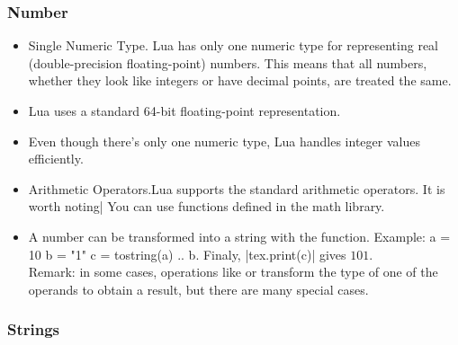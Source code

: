 \subsubsection{Number}


\begin{itemize}
  \item Single Numeric Type.  Lua has only one numeric type for representing real (double-precision floating-point) numbers. This means that all numbers, whether they look like integers or have decimal points, are treated the same.

\item Lua uses a standard 64-bit floating-point representation.
\item Even though there's only one numeric type, Lua handles integer values efficiently.

\item  Arithmetic Operators.Lua supports the standard arithmetic operators. It is worth noting|%
You can use functions defined in the math library.

\item A number can be transformed into a string with the  function. Example: a = 10 b = "1" c = tostring(a) .. b. Finaly, |tex.print(c)| gives $101$.\\
Remark: in some cases, operations like  or  transform the type of one of the operands to obtain a result, but there are many special cases.

\end{itemize}

\subsubsection{Strings}

